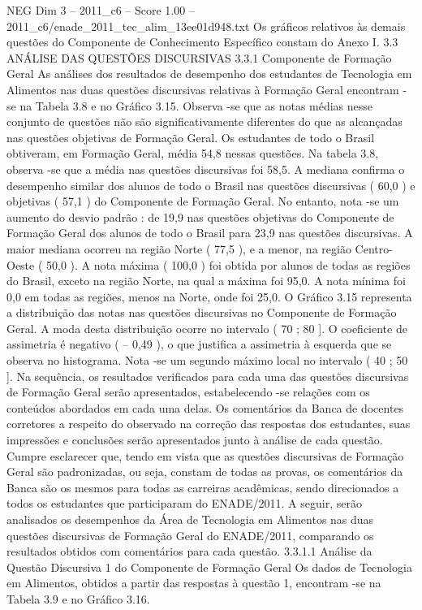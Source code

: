 \begin{textsample}{NEG Dim 3 – 2011\_c6 – Score 1.00 – 2011\_c6/enade\_2011\_tec\_alim\_13ee01d948.txt}
Os gráficos relativos às demais questões do Componente de Conhecimento Específico constam do Anexo I. 3.3 ANÁLISE DAS QUESTÕES DISCURSIVAS 3.3.1 Componente de Formação Geral As análises dos resultados de desempenho dos estudantes de Tecnologia em Alimentos nas duas questões discursivas relativas à Formação Geral encontram -se na Tabela 3.8 e no Gráfico 3.15.
Observa -se que as notas médias nesse conjunto de questões não são significativamente diferentes do que as alcançadas nas questões objetivas de Formação Geral.
Os estudantes de todo o Brasil obtiveram, em Formação Geral, média 54,8 nessas questões.
Na tabela 3.8, observa -se que a média nas questões discursivas foi 58,5.
A mediana confirma o desempenho similar dos alunos de todo o Brasil nas questões discursivas ( 60,0 ) e objetivas ( 57,1 ) do Componente de Formação Geral.
No entanto, nota -se um aumento do desvio padrão : de 19,9 nas questões objetivas do Componente de Formação Geral dos alunos de todo o Brasil para 23,9 nas questões discursivas.
A maior mediana ocorreu na região Norte ( 77,5 ), e a menor, na região Centro-Oeste ( 50,0 ).
A nota máxima ( 100,0 ) foi obtida por alunos de todas as regiões do Brasil, exceto na região Norte, na qual a máxima foi 95,0.
A nota mínima foi 0,0 em todas as regiões, menos na Norte, onde foi 25,0.
O Gráfico 3.15 representa a distribuição das notas nas questões discursivas no Componente de Formação Geral.
A moda desta distribuição ocorre no intervalo ( 70 ; 80 ].
O coeficiente de assimetria é negativo ( – 0,49 ), o que justifica a assimetria à esquerda que se observa no histograma.
Nota -se um segundo máximo local no intervalo ( 40 ; 50 ].
Na sequência, os resultados verificados para cada uma das questões discursivas de Formação Geral serão apresentados, estabelecendo -se relações com os conteúdos abordados em cada uma delas.
Os comentários da Banca de docentes corretores a respeito do observado na correção das respostas dos estudantes, suas impressões e conclusões serão apresentados junto à análise de cada questão.
Cumpre esclarecer que, tendo em vista que as questões discursivas de Formação Geral são padronizadas, ou seja, constam de todas as provas, os comentários da Banca são os mesmos para todas as carreiras acadêmicas, sendo direcionados a todos os estudantes que participaram do ENADE/2011.
A seguir, serão analisados os desempenhos da Área de Tecnologia em Alimentos nas duas questões discursivas de Formação Geral do ENADE/2011, comparando os resultados obtidos com comentários para cada questão. 3.3.1.1 Análise da Questão Discursiva 1 do Componente de Formação Geral Os dados de Tecnologia em Alimentos, obtidos a partir das respostas à questão 1, encontram -se na Tabela 3.9 e no Gráfico 3.16.

\end{textsample}
